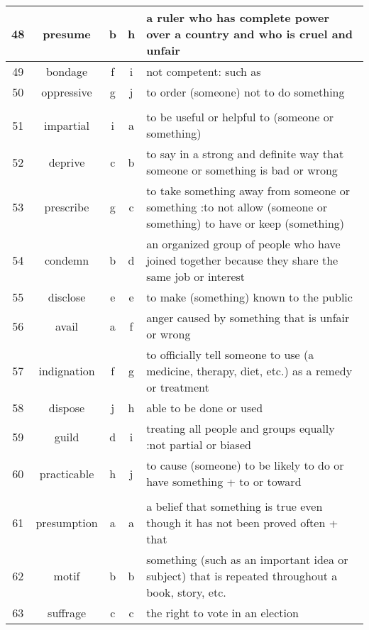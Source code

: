 \documentclass[a4paper]{article}
\begin{document}
\begin{center}
\begin{tabular}{|c|c|c|c|m{}|}
\hline
 48  & presume & b & h &  a ruler who has complete power over a country and who is cruel and unfair \\
\hline
 49  & bondage & f & i &  not competent: such as\\
\hline
 50  & oppressive & g & j &  to order (someone) not to do something \\
\hline
 & & & & \\
\hline
 51  & impartial & i & a &  to be useful or helpful to (someone or something) \\
\hline
 52  & deprive & c & b &  to say in a strong and definite way that someone or something is bad or wrong \\
\hline
 53  & prescribe & g & c &  to take something away from someone or something :to not allow (someone or something) to have or keep (something) \\
\hline
 54  & condemn & b & d &  an organized group of people who have joined together because they share the same job or interest \\
\hline
 55  & disclose & e & e &  to make (something) known to the public \\
\hline
 56  & avail & a & f &  anger caused by something that is unfair or wrong \\
\hline
 57  & indignation & f & g &  to officially tell someone to use (a medicine, therapy, diet, etc.) as a remedy or treatment \\
\hline
 58  & dispose & j & h &  able to be done or used \\
\hline
 59  & guild & d & i &  treating all people and groups equally :not partial or biased \\
\hline
 60  & practicable & h & j &  to cause (someone) to be likely to do or have something + to or toward \\
\hline
 & & & & \\
\hline
 61  & presumption & a & a &  a belief that something is true even though it has not been proved often + that \\
\hline
 62  & motif & b & b &  something (such as an important idea or subject) that is repeated throughout a book, story, etc.\\
\hline
 63  & suffrage & c & c &  the right to vote in an election \\
\hline
\end{tabular}
\end{center}
\end{document}
